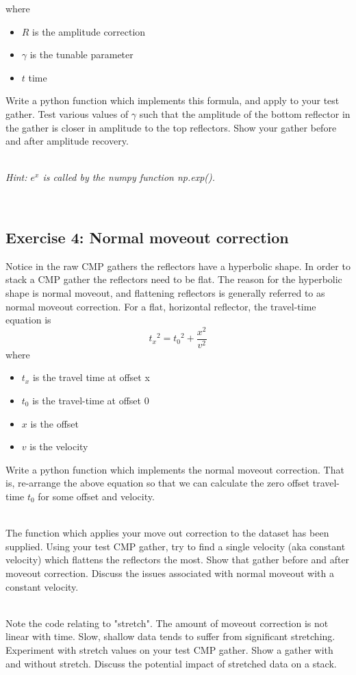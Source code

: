 where
\begin{itemize}
\item $R$ is the amplitude correction
\item $\gamma$ is the tunable parameter
\item $t$ time
\end{itemize}

Write a python function which implements this formula, and apply to your test gather.  Test various values of $\gamma$ such that the amplitude of the bottom reflector in the gather is closer in amplitude to the top reflectors. Show your gather before and after amplitude recovery. 
\par~\\
\emph{Hint: $e^x$ is called by the numpy function np.exp().}
\par~\\

\subsection*{Exercise 4: Normal moveout correction}
Notice in the raw CMP gathers the reflectors have a hyperbolic shape.  In order to stack a CMP gather the reflectors need to be flat.  The reason for the hyperbolic shape is normal moveout, and flattening reflectors is generally referred to as normal moveout correction.  For a flat, horizontal reflector, the travel-time equation is
\[ {t_x}^2 = {t_0}^2 + \frac{x^2}{v^2}\]
where
\begin{itemize}
\item $t_x$ is the travel time at offset x
\item $t_0$ is the travel-time at offset 0
\item $x$ is the offset
\item $v$ is the velocity
\end{itemize}
Write a python function which implements the normal moveout correction. That is, re-arrange the above equation so that we can calculate the zero offset travel-time $t_0$ for some offset and velocity.
\par~\\
The function which applies your move out correction to the dataset has been supplied. Using your test CMP gather, try to find a single velocity (aka constant velocity) which flattens the reflectors the most. Show that gather before and after moveout correction.  Discuss the issues associated with normal moveout with a constant velocity.
\par~\\
Note the code relating to "stretch".  The amount of moveout correction is not linear with time. Slow, shallow data tends to suffer from significant stretching. Experiment with stretch values on your test CMP gather. Show a gather with and without stretch.  Discuss the potential impact of stretched data on a stack.

